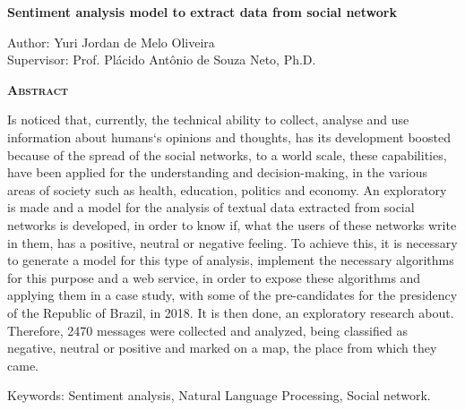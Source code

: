 \begin{center}
	{\Large{\textbf{Sentiment analysis model to extract data from social network}}}
\end{center}

\vspace{1cm}

\begin{flushright}
	Author: Yuri Jordan de Melo Oliveira\\
	Supervisor: Prof. Plácido Antônio de Souza Neto, Ph.D.
\end{flushright}

\vspace{1cm}

\begin{center}
	\Large{\textsc{\textbf{Abstract}}}
\end{center}

\noindent Is noticed that, currently, the technical ability to collect, analyse and use information about humans`s opinions and thoughts, has its development boosted because of the spread of the social networks, to a world scale, these capabilities, have been applied for the understanding and decision-making, in the various areas of society such as health, education, politics and economy. An exploratory is made and a model for the analysis of textual data extracted from social networks is developed, in order to know if, what the users of these networks write in them, has a positive, neutral or negative feeling. To achieve this, it is necessary to generate a model for this type of analysis, implement the necessary algorithms for this purpose and a web service, in order to expose these algorithms and applying them in a case study, with some of the pre-candidates for the presidency of the Republic of Brazil, in 2018. It is then done, an exploratory research about. Therefore, 2470 messages were collected and analyzed, being classified as negative, neutral or positive and marked on a map, the place from which they came.

\noindent Keywords:  Sentiment analysis, Natural Language Processing, Social network.



